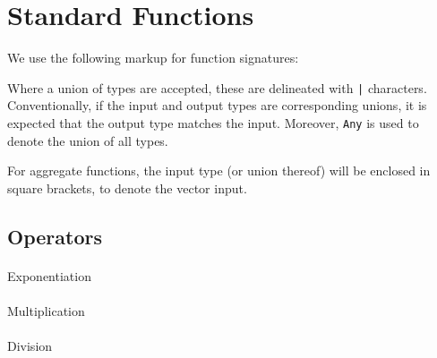 % 
% 
% 
% 
% 

\section{Standard Functions}

We use the following markup for function signatures:

\begin{center}
\end{center}

Where a union of types are accepted, these are delineated with
\texttt{|} characters. Conventionally, if the input and output types are
corresponding unions, it is expected that the output type matches the
input. Moreover, \texttt{Any} is used to denote the union of all types.

For aggregate functions, the input type (or union thereof) will be
enclosed in square brackets, to denote the vector input.

\subsection{Operators}

\paragraph{} Exponentiation
\paragraph{} Multiplication
\paragraph{} Division
